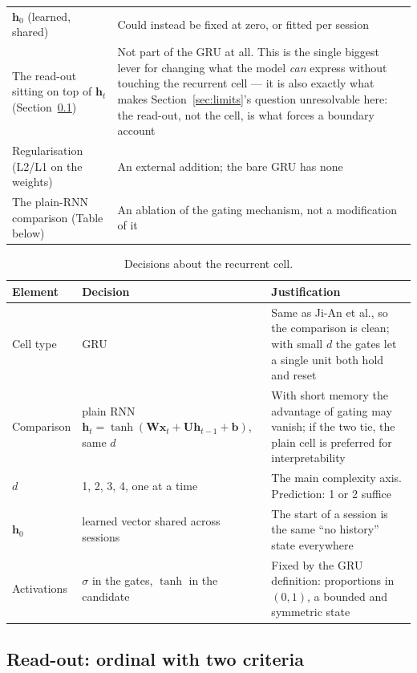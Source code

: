 \documentclass[11pt,a4paper]{article}
\newcommand{\vect}[1]{\bm{#1}}
\begin{document}
\begin{table}[H]
\begin{tabular}{p{6.3cm}p{8.5cm}}
    $\vect{h}_0$ (learned, shared) & Could instead be fixed at zero, or fitted per session \\
    The read-out sitting on top of $\vect{h}_t$ (Section~\ref{sec:readout}) &
      Not part of the GRU at all. This is the single biggest lever for changing what the model \emph{can} express without touching the recurrent cell — it is also exactly what makes Section~\ref{sec:limits}'s question unresolvable here: the read-out, not the cell, is what forces a boundary account \\
    Regularisation (L2/L1 on the weights) & An external addition; the bare GRU has none \\
    The plain-RNN comparison (Table below) & An ablation of the gating mechanism, not a modification of it \\
    \bottomrule
  \end{tabular}
\end{table}

\begin{table}[H]
  \centering\small
  \caption{Decisions about the recurrent cell.}
  \begin{tabular}{lp{5cm}p{7.5cm}}
    \toprule
    Element & Decision & Justification \\
    \midrule
    Cell type & GRU & Same as Ji-An et al., so the comparison is clean; with small $d$ the gates let a single unit both hold and reset \\
    Comparison & plain RNN $\vect{h}_t = \tanh(\vect{W}\vect{x}_t + \vect{U}\vect{h}_{t-1} + \vect{b})$, same $d$ & With short memory the advantage of gating may vanish; if the two tie, the plain cell is preferred for interpretability \\
    $d$ & 1, 2, 3, 4, one at a time & The main complexity axis. Prediction: 1 or 2 suffice \\
    $\vect{h}_0$ & learned vector shared across sessions & The start of a session is the same ``no history'' state everywhere \\
    Activations & $\sigma$ in the gates, $\tanh$ in the candidate & Fixed by the GRU definition: proportions in $(0,1)$, a bounded and symmetric state \\
    \bottomrule
  \end{tabular}
\end{table}

\subsection{Read-out: ordinal with two criteria}
\label{sec:readout}
\end{document}
